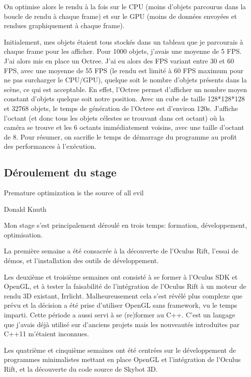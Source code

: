 \documentclass[a4paper,french,12pt]{article}
\begin{document}
		On optimise alors le rendu à la fois sur le CPU (moins d'objets parcourus dans la boucle
			      de rendu à chaque frame) et sur le GPU (moins de données envoyées et
			      rendues graphiquement à chaque frame).


		Initialement, mes objets étaient tous stockés dans un tableau que je parcourais à chaque frame pour les afficher.
		Pour 1000 objets, j'avais une moyenne de 5 FPS.
		J'ai alors mis en place un Octree. J'ai eu alors des FPS variant entre 30 et 60 FPS, avec une moyenne de 55 FPS
		(le rendu est limité à 60 FPS maximum
		pour ne pas surcharger le CPU/GPU), quelque soit le nombre d'objets présents dans la scène, ce qui est acceptable.
		En effet, l'Octree permet d'afficher un nombre moyen constant d'objets quelque soit notre position.
		Avec un cube de taille 128*128*128 et 32768 objets, le temps de génération de l'Octree est d'environ 120s.
		J'affiche l'octant (et donc tous les objets célestes se trouvant dans cet octant) où la caméra se trouve
		et les 6 octants immédiatement voisins, avec une taille d'octant de 8.
		Pour résumer, on sacrifie le temps de démarrage du programme au profit des performances à l'exécution.




	\subsection{Déroulement du stage}

	   \epigraph{Premature optimization is the source of all evil}{Donald Knuth}

		Mon stage s'est principalement déroulé en trois temps: formation, développement, optimisation.

		La première semaine a été consacrée à la découverte de l'Oculus Rift, l'essai de démos, et l'installation
		des outils de développement.

		Les deuxième et troisième semaines ont consisté à se former à l'Oculus SDK et OpenGL, et à tester la
		faisabilité de l'intégration de l'Oculus Rift à un moteur de rendu 3D existant, Irrlicht. Malheureusement
		cela s'est révélé plus complexe que prévu et la décision a été prise d'utiliser OpenGL sans framework,
		vu le temps imparti.
		Cette période a aussi servi à se (re)former au C++. C'est un langage que j'avais déjà utilisé sur d'anciens
		projets mais les nouveautés introduites par C++11 m'étaient inconnues.

		Les quatrième et cinquième semaines ont été centrées sur le développement de programmes minimalistes mettant
		en place OpenGL et l'intégration de l'Oculus Rift, et la découverte du code source de Skybot 3D.
\end{document}
